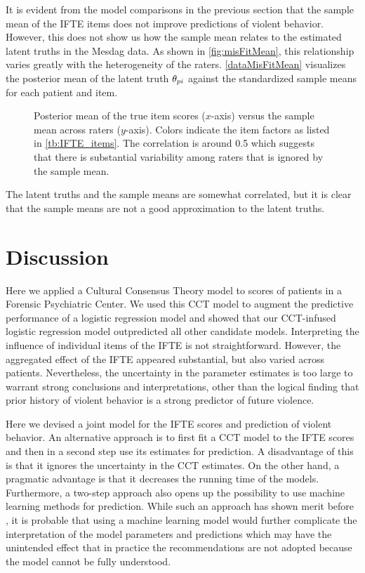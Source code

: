 \documentclass[a4paper,11pt]{article}
\begin{document}
It is evident from the model comparisons in the previous section that the sample mean of the IFTE items does not improve predictions of violent behavior.
However, this does not show us how the sample mean relates to the estimated latent truths in the Mesdag data.
As shown in \autoref{fig:misFitMean}, this relationship varies greatly with the heterogeneity of the raters.
\autoref{dataMisFitMean} visualizes the posterior mean of the latent truth $\theta_{pi}$ against the standardized sample means for each patient and item. 
\begin{figure}[!ht]
    \centering
    
    \caption{Posterior mean of the true item scores ($x$-axis) versus the sample mean across raters ($y$-axis). Colors indicate the item factors as listed in \autoref{tb:IFTE_items}. The correlation is around 0.5 which suggests that there is substantial variability among raters that is ignored by the sample mean.}
    \label{fig:dataMisFitMean}
\end{figure}
The latent truths and the sample means are somewhat correlated, but it is clear that the sample means are not a good approximation to the latent truths.

\section{Discussion}
Here we applied a Cultural Consensus Theory model to scores of patients in a Forensic Psychiatric Center.
We used this CCT model to augment the predictive performance of a logistic regression model and showed that our CCT-infused logistic regression model outpredicted all other candidate models.
Interpreting the influence of individual items of the IFTE is not straightforward. 
However, the aggregated effect of the IFTE appeared substantial, but also varied across patients.
Nevertheless, the uncertainty in the parameter estimates is too large to warrant strong conclusions and interpretations, other than the logical finding that prior history of violent behavior is a strong predictor of future violence.

Here we devised a joint model for the IFTE scores and prediction of violent behavior.
An alternative approach is to first fit a CCT model to the IFTE scores and then in a second step use its estimates for prediction.
A disadvantage of this is that it ignores the uncertainty in the CCT estimates.
On the other hand, a pragmatic advantage is that it decreases the running time of the models.
Furthermore, a two-step approach also opens up the possibility to use machine learning methods for prediction.
While such an approach has shown merit before \parencite[see e.g.,][]{plonsky2017psychological}, it is probable that using a machine learning model would further complicate the interpretation of the model parameters and predictions which may have the unintended effect that in practice the recommendations are not adopted because the model cannot be fully understood.
\end{document}
